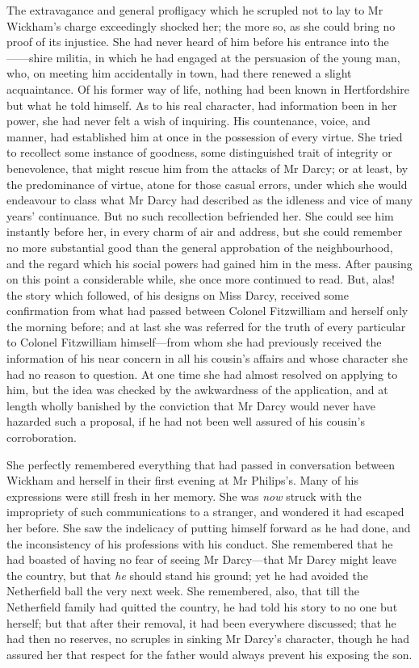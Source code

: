 The extravagance and general profligacy which he scrupled not to lay to Mr Wickham's charge exceedingly shocked her; the more so, as she could bring no proof of its injustice. She had never heard of him before his entrance into the ——shire militia, in which he had engaged at the persuasion of the young man, who, on meeting him accidentally in town, had there renewed a slight acquaintance. Of his former way of life, nothing had been known in Hertfordshire but what he told himself. As to his real character, had information been in her power, she had never felt a wish of inquiring. His countenance, voice, and manner, had established him at once in the possession of every virtue. She tried to recollect some instance of goodness, some distinguished trait of integrity or benevolence, that might rescue him from the attacks of Mr Darcy; or at least, by the predominance of virtue, atone for those casual errors, under which she would endeavour to class what Mr Darcy had described as the idleness and vice of many years' continuance. But no such recollection befriended her. She could see him instantly before her, in every charm of air and address, but she could remember no more substantial good than the general approbation of the neighbourhood, and the regard which his social powers had gained him in the mess. After pausing on this point a considerable while, she once more continued to read. But, alas! the story which followed, of his designs on Miss Darcy, received some confirmation from what had passed between Colonel Fitzwilliam and herself only the morning before; and at last she was referred for the truth of every particular to Colonel Fitzwilliam himself—from whom she had previously received the information of his near concern in all his cousin's affairs and whose character she had no reason to question. At one time she had almost resolved on applying to him, but the idea was checked by the awkwardness of the application, and at length wholly banished by the conviction that Mr Darcy would never have hazarded such a proposal, if he had not been well assured of his cousin's corroboration.

She perfectly remembered everything that had passed in conversation between Wickham and herself in their first evening at Mr Philips's. Many of his expressions were still fresh in her memory. She was \textit{now} struck with the impropriety of such communications to a stranger, and wondered it had escaped her before. She saw the indelicacy of putting himself forward as he had done, and the inconsistency of his professions with his conduct. She remembered that he had boasted of having no fear of seeing Mr Darcy—that Mr Darcy might leave the country, but that \textit{he} should stand his ground; yet he had avoided the Netherfield ball the very next week. She remembered, also, that till the Netherfield family had quitted the country, he had told his story to no one but herself; but that after their removal, it had been everywhere discussed; that he had then no reserves, no scruples in sinking Mr Darcy's character, though he had assured her that respect for the father would always prevent his exposing the son.

